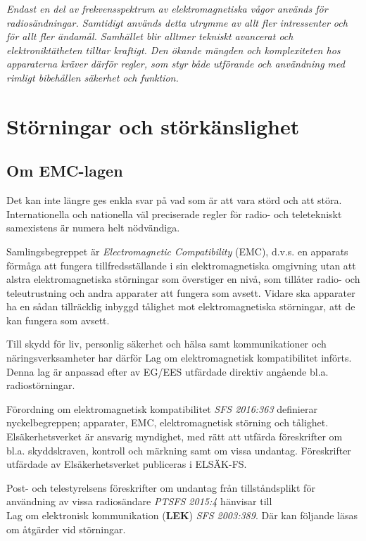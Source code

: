 \emph{Endast en del av frekvensspektrum av elektromagnetiska vågor används för
radiosändningar. Samtidigt används detta utrymme av allt fler intressenter och
för allt fler ändamål. Samhället blir alltmer tekniskt avancerat och
elektroniktätheten tilltar kraftigt. Den ökande mängden och komplexiteten hos
apparaterna kräver därför regler, som styr både utförande och användning med
rimligt bibehållen säkerhet och funktion.}

\section{Störningar och störkänslighet}

\subsection{Om EMC-lagen}
\label{EMC-lagen}

Det kan inte längre ges enkla svar på vad som är att vara störd och att störa.
Internationella och nationella väl preciserade regler för radio- och
teletekniskt samexistens är numera helt nödvändiga.

Samlingsbegreppet är \emph{Electromagnetic Compatibility} (EMC), d.v.s. en
apparats förmåga att fungera tillfredsställande i sin elektromagnetiska
omgivning utan att alstra elektromagnetiska störningar som överstiger en nivå,
som tillåter radio- och teleutrustning och andra apparater att fungera som
avsett. Vidare ska apparater ha en sådan tillräcklig inbyggd tålighet mot
elektromagnetiska störningar, att de kan fungera som avsett.

Till skydd för liv, personlig säkerhet och hälsa samt kommunikationer och
näringsverksamheter har därför Lag om elektromagnetisk kompatibilitet införts.
Denna lag är anpassad efter av EG/EES utfärdade direktiv angående bl.a.
radiostörningar.

Förordning om elektromagnetisk kompatibilitet \emph{SFS 2016:363} definierar
nyckelbegreppen; apparater, EMC, elektromagnetisk störning och tålighet.
Elsäkerhetsverket är ansvarig myndighet, med rätt att utfärda föreskrifter om
bl.a. skyddskraven, kontroll och märkning samt om vissa undantag.
Föreskrifter utfärdade av Elsäkerhetsverket publiceras i ELSÄK-FS.

Post- och telestyrelsens föreskrifter om undantag från tillståndsplikt för användning av vissa radiosändare \emph{PTSFS 2015:4} hänvisar till\\
Lag om elektronisk kommunikation (\textbf{LEK}) \emph{SFS 2003:389}. Där kan följande läsas om åtgärder vid störningar.  

